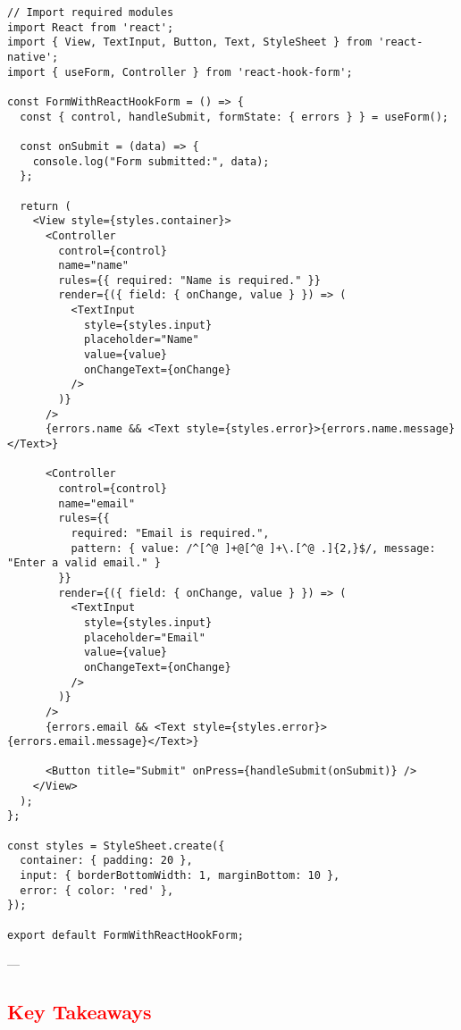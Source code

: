 \documentclass[12pt]{article}
\begin{document}
\begin{tcolorbox}[colback=gray!5, colframe=gray!50, title=React Native Code Example (With `react-hook-form`)]
\begin{lstlisting}[style=customJavaScript]
// Import required modules
import React from 'react';
import { View, TextInput, Button, Text, StyleSheet } from 'react-native';
import { useForm, Controller } from 'react-hook-form';

const FormWithReactHookForm = () => {
  const { control, handleSubmit, formState: { errors } } = useForm();

  const onSubmit = (data) => {
    console.log("Form submitted:", data);
  };

  return (
    <View style={styles.container}>
      <Controller
        control={control}
        name="name"
        rules={{ required: "Name is required." }}
        render={({ field: { onChange, value } }) => (
          <TextInput
            style={styles.input}
            placeholder="Name"
            value={value}
            onChangeText={onChange}
          />
        )}
      />
      {errors.name && <Text style={styles.error}>{errors.name.message}</Text>}

      <Controller
        control={control}
        name="email"
        rules={{
          required: "Email is required.",
          pattern: { value: /^[^@ ]+@[^@ ]+\.[^@ .]{2,}$/, message: "Enter a valid email." }
        }}
        render={({ field: { onChange, value } }) => (
          <TextInput
            style={styles.input}
            placeholder="Email"
            value={value}
            onChangeText={onChange}
          />
        )}
      />
      {errors.email && <Text style={styles.error}>{errors.email.message}</Text>}

      <Button title="Submit" onPress={handleSubmit(onSubmit)} />
    </View>
  );
};

const styles = StyleSheet.create({
  container: { padding: 20 },
  input: { borderBottomWidth: 1, marginBottom: 10 },
  error: { color: 'red' },
});

export default FormWithReactHookForm;
\end{lstlisting}
\end{tcolorbox}

---

\subsection*{\textcolor{red}{Key Takeaways}}
\end{document}

